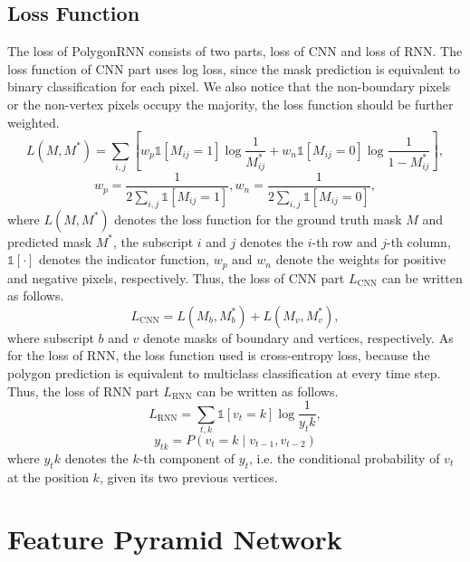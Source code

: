 \subsection{Loss Function}\label{losspoly}
The loss of PolygonRNN consists of two parts, loss of CNN and loss of RNN. The loss function of CNN part uses log loss, since the mask prediction is equivalent to binary classification for each pixel. We also notice that the non-boundary pixels or the non-vertex pixels occupy the majority, the loss function should be further weighted.
\begin{equation}
	L(M, M^*) = \sum_{i, j} \left[w_p\mathbb{1}[M_{ij} = 1]\log{\frac{1}{M^*_{ij}}} + w_n\mathbb{1}[M_{ij} = 0]\log{\frac{1}{1-M^*_{ij}}} \right],
\end{equation}
\begin{equation}
	w_p = \frac{1}{2\sum_{i, j}\mathbb{1}[M_{ij} = 1]}, w_n = \frac{1}{2\sum_{i, j}\mathbb{1}[M_{ij} = 0]},
\end{equation}
where $L(M, M^*)$ denotes the loss function for the ground truth mask $M$ and predicted mask $M^*$, the subscript $i$ and $j$ denotes the $i$-th row and $j$-th column, $\mathbb{1}[\cdot]$ denotes the indicator function, $w_p$ and $w_n$ denote the weights for positive and negative pixels, respectively. Thus, the loss of CNN part $L_{\text{CNN}}$ can be written as follows.
\begin{equation}
	L_{\text{CNN}} = L(M_b, M^*_b) + L(M_v, M^*_v),
\end{equation}
where subscript $b$ and $v$ denote masks of boundary and vertices, respectively. As for the loss of RNN, the loss function used is cross-entropy loss, because the polygon prediction is equivalent to multiclass classification at every time step. Thus, the loss of RNN part $L_{\text{RNN}}$ can be written as follows.
\begin{equation}
	L_{\text{RNN}} = \sum_{t, k}\mathbb{1}[v_{t} = k]\log{\frac{1}{y_tk}},
\end{equation}
\begin{equation}
	y_{tk} = P(v_t = k \mid v_{t-1}, v_{t-2})
\end{equation}
where $y_tk$ denotes the $k$-th component of $y_t$, i.e. the conditional probability of $v_t$ at the position $k$, given its two previous vertices.

\section{Feature Pyramid Network}\label{modfpn}

